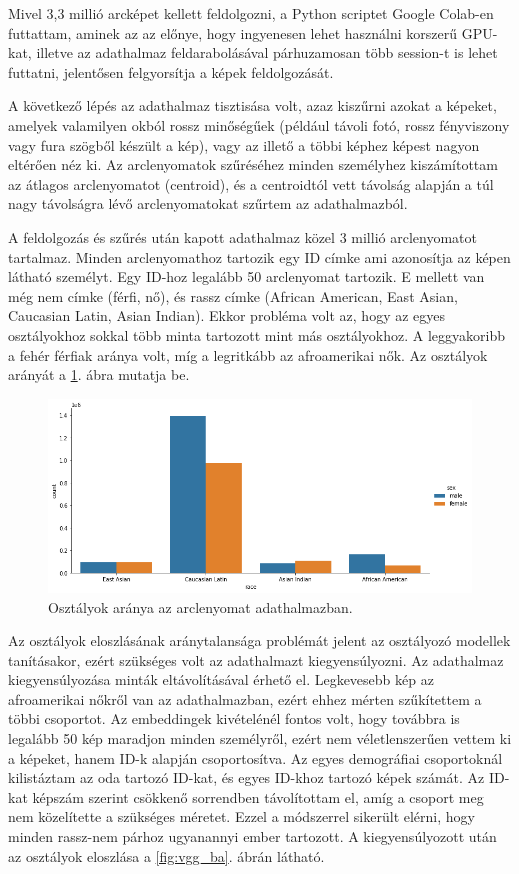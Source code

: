 Mivel 3,3 millió arcképet kellett feldolgozni, a Python scriptet Google Colab-en futtattam, aminek az az előnye, hogy ingyenesen lehet használni korszerű GPU-kat, illetve az adathalmaz feldarabolásával párhuzamosan több session-t is lehet futtatni, jelentősen felgyorsítja a képek feldolgozását.

A következő lépés az adathalmaz tisztisása volt, azaz kiszűrni azokat a képeket, amelyek valamilyen okból rossz minőségűek (például távoli fotó, rossz fényviszony vagy fura szögből készült a kép), vagy az illető a többi képhez képest nagyon eltérően néz ki. Az arclenyomatok szűréséhez minden személyhez kiszámítottam az átlagos arclenyomatot (centroid), és a centroidtól vett távolság alapján a túl nagy távolságra lévő arclenyomatokat szűrtem az adathalmazból. 

A feldolgozás és szűrés után kapott adathalmaz közel 3 millió arclenyomatot tartalmaz. Minden arclenyomathoz tartozik egy ID címke ami azonosítja az képen látható személyt. Egy ID-hoz legalább 50 arclenyomat tartozik. E mellett van még nem címke (férfi, nő), és rassz címke (African American, East Asian, Caucasian Latin, Asian Indian). Ekkor probléma volt az, hogy az egyes osztályokhoz sokkal több minta tartozott mint más osztályokhoz. A leggyakoribb a fehér férfiak aránya volt, míg a legritkább az afroamerikai nők. Az osztályok arányát a \ref{fig:vgg_imba}. ábra mutatja be.

\begin{figure}[ht]
	\centering
	\includegraphics[width=1\columnwidth]{figures/VGG_imba.png}
	\caption{Osztályok aránya az arclenyomat adathalmazban.}
	\label{fig:vgg_imba}
\end{figure}

Az osztályok eloszlásának aránytalansága problémát jelent az osztályozó modellek tanításakor, ezért szükséges volt az adathalmazt kiegyensúlyozni. Az adathalmaz kiegyensúlyozása minták eltávolításával érhető el. Legkevesebb kép az afroamerikai nőkről van az adathalmazban, ezért ehhez mérten szűkítettem a többi csoportot. Az embeddingek kivételénél fontos volt, hogy továbbra is legalább 50 kép maradjon minden személyről, ezért nem véletlenszerűen vettem ki a képeket, hanem ID-k alapján csoportosítva. Az egyes demográfiai csoportoknál kilistáztam az oda tartozó ID-kat, és egyes ID-khoz tartozó képek számát. Az ID-kat képszám szerint csökkenő sorrendben távolítottam el, amíg a csoport meg nem közelítette a szükséges méretet. Ezzel a módszerrel sikerült elérni, hogy minden rassz-nem párhoz ugyanannyi ember tartozott. A kiegyensúlyozott után az osztályok eloszlása a \ref{fig:vgg_ba}. ábrán látható.

